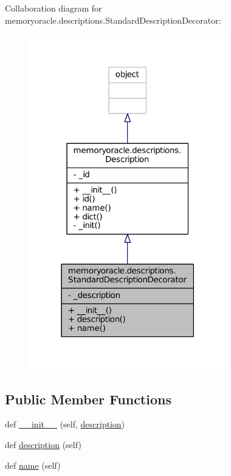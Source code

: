 Collaboration diagram for memoryoracle.\+descriptions.\+Standard\+Description\+Decorator\+:\nopagebreak
\begin{figure}[H]
\begin{center}
\leavevmode
\includegraphics[width=243pt]{classmemoryoracle_1_1descriptions_1_1StandardDescriptionDecorator__coll__graph}
\end{center}
\end{figure}
\subsection*{Public Member Functions}
\begin{DoxyCompactItemize}
\item 
def \hyperlink{classmemoryoracle_1_1descriptions_1_1StandardDescriptionDecorator_a46d6f7565415b1ff607d61c9afa6f6d0}{\+\_\+\+\_\+init\+\_\+\+\_\+} (self, \hyperlink{classmemoryoracle_1_1descriptions_1_1StandardDescriptionDecorator_a50e064e8a858b8eafe2c603650dbbee8}{description})
\item 
def \hyperlink{classmemoryoracle_1_1descriptions_1_1StandardDescriptionDecorator_a50e064e8a858b8eafe2c603650dbbee8}{description} (self)
\item 
def \hyperlink{classmemoryoracle_1_1descriptions_1_1StandardDescriptionDecorator_a06d5c7b1716ece015737e1137f39f56d}{name} (self)
\end{DoxyCompactItemize}
